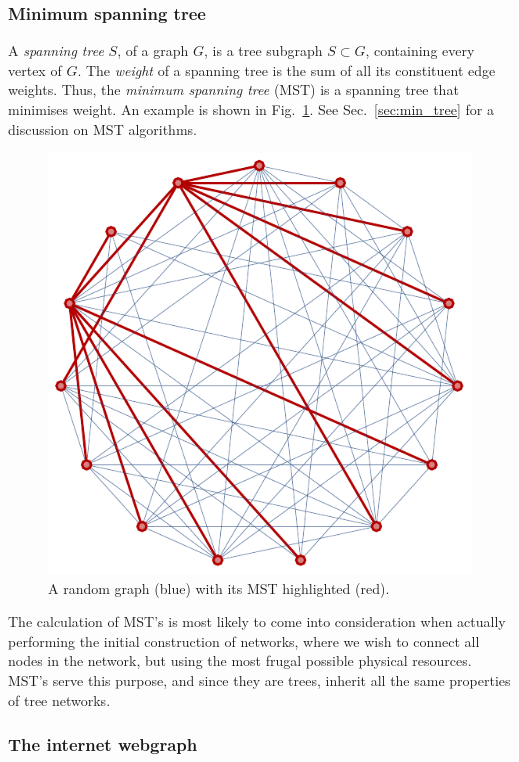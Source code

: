 \documentclass[aps,rmp,twocolumn,amsmath,amssymb,nofootinbib,superscriptaddress,longbibliography,floatfix]{revtex4-1}
\begin{document}
%
%

\subsubsection{Minimum spanning tree} \label{sec:graph_MST}

A \emph{spanning tree} $S$, of a graph $G$, is a tree subgraph \mbox{$S\subset G$}, containing every vertex of $G$. The \emph{weight} of a spanning tree is the sum of all its constituent edge weights. Thus, the \emph{minimum spanning tree} (MST) is a spanning tree that minimises weight. An example is shown in Fig.~\ref{fig:mst}. See Sec.~\ref{sec:min_tree} for a discussion on MST algorithms.

\begin{figure}[!htb]
\includegraphics[width=0.8\columnwidth]{mst}
\caption{A random graph (blue) with its MST highlighted (red).} \label{fig:mst}
\end{figure}

The calculation of MST's is most likely to come into consideration when actually performing the initial construction of networks, where we wish to connect all nodes in the network, but using the most frugal possible physical resources. MST's serve this purpose, and since they are trees, inherit all the same properties of tree networks.

%
%

\subsubsection{The internet webgraph}
\end{document}

